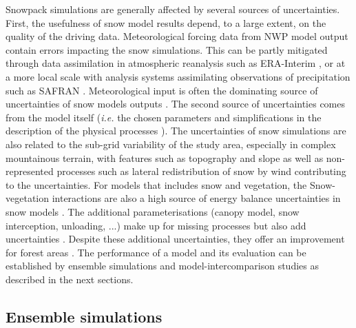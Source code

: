\documentclass[utf8]{frontiersSCNS} %
\begin{document}
Snowpack simulations are generally affected by several sources of uncertainties. First, the usefulness of snow model results depend, to a large extent, on the quality of the driving data. Meteorological forcing data from NWP model output contain errors impacting the snow simulations. This can be partly mitigated through data assimilation in atmospheric reanalysis such as ERA-Interim \citep{Dee_2011}, or at a more local scale with analysis systems assimilating observations of precipitation such as SAFRAN \citep{Durand_1993}. Meteorological input is often the dominating source of uncertainties of snow models outputs \citep{Fekete_2004,Bosilovich_2008,Raleigh_2015,Magnusson_2015}. The second source of uncertainties comes from the model itself (\textit{i.e.} the chosen parameters and simplifications in the description of the physical processes \citep{Essery_2013,Lafaysse_2017}). The uncertainties of snow simulations are also related to the sub-grid variability of the study area, especially in complex mountainous terrain, with features such as topography and slope as well as non-represented processes such as lateral redistribution of snow by wind contributing to the uncertainties. For models that includes snow and vegetation, the Snow-vegetation interactions are also a high source of energy balance uncertainties in snow models \citep{Boone_2017,Rutter_2009,Todt_2018}. The additional parameterisations (canopy model, snow interception, unloading, ...) make up for missing processes but also add uncertainties \citep{Mahat_2014}. Despite these additional uncertainties, they offer an improvement for forest areas \citep{Todt_2018}. The performance of a model and its evaluation can be established by ensemble simulations and model-intercomparison studies as described in the next sections.

\subsection{Ensemble simulations}
\end{document}
